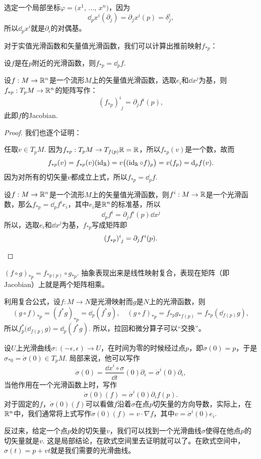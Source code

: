 选定一个局部坐标$\varphi=(x^1$, $\dots$, $x^n)$，因为
\[
	\dd_p x^i(\partial_j)=\partial_jx^i(p)=\delta^i_j,
\]
所以$\dd_p x^i$就是$\partial_i$的对偶基。

\begin{pro}对于实值光滑函数和矢量值光滑函数，我们可以计算出推前映射$f_{*p}$：
\begin{compactenum}
\item 设$f$是在$p$附近的光滑函数，则$f_{*p}=\dd_p f$. 
\item 设$f:M\to \mathbb{R}^n$是一个流形$M$上的矢量值光滑函数，选取$e_i$和$\dd x^j$为基，则$f_{*p}:T_pM\to \mathbb{R}^n$的矩阵写作：
\[
	(f_{*p})^{i}_{\phantom{i}j}=\partial_j f^i(p),
\]
此即$f$的Jacobian.
\end{compactenum}
\end{pro}

\begin{proof}
我们也逐个证明：
\begin{compactenum}
\item 任取$v\in T_pM$. 因为$f_{*p}:T_pM\to T_{f(p)}\mathbb{R}=\mathbb{R}$，所以$f_{*p}(v)$是一个数，故而
\[
	f_{*p}(v)=f_{*p}(v)(\operatorname{id}_{\mathbb{R}})=v\bigl((\operatorname{id}_{\mathbb{R}}\circ f)_p\bigr)=v(f_p)=\mathrm{d}_p f(v).
\]
因为对所有的切矢量$v$都成立上式，所以$f_{*p}=\dd_p f$.
\item 设$f:M\to \mathbb{R}^n$是一个流形$M$上的矢量值光滑函数，则$f^i:M\to \mathbb{R}$是一个光滑函数，那么$f_{*p}=\dd_pf^i e_i$，其中$e_i$是$\mathbb{R}^n$的标准基，所以
\[
\dd_pf^i=\partial_j f^i(p) \dd x^j
\]
所以，选取$e_i$和$\dd x^j$为基，$f_{*p}$写成矩阵即
\[
	(f_{*p})^{i}_{\phantom{i}j}=\partial_j f^i(p).\qedhere
\]
\end{compactenum}
\end{proof}

\begin{para}[复合函数求导法则]
$(f\circ g)_{*p}=f_{*g(p)}\circ g_{*p}$. 抽象表现出来是线性映射复合，表现在矩阵（即Jacobian）上就是两个矩阵相乘。
\end{para}

\begin{para}\label{f*d=df*}
利用复合公式，设$f:M\to N$是光滑映射而$g$是$N$上的光滑函数，则
\[
	(g\circ f)_{*p}=(f^*g)_{*p}=\dd_p(f^*g),\quad (g\circ f)_{*p}=f_{*p}g_{*f(p)}=f_{*p}\left(\dd_{f(p)}g \right),
\]
所以$f^*_p\bigl(\dd_{f(p)}g\bigr)=\dd_{p}(f^*g)$. 所以，拉回和微分算子可以“交换”。
\end{para}

\begin{para}
设$U$上光滑曲线$\sigma:(-\epsilon,\epsilon)\to U$，在时间为零的时候经过点$p$，即$\sigma(0)=p$，于是$\sigma_{*0}=\dot\sigma(0)\in T_pM$. 局部来说，他可以写作
\[
	\dot{\sigma}(0)=\frac{\dd x^i\circ \sigma}{\dd t}(0)\partial_i=\dot \sigma^i(0)\partial_i,
\]
当他作用在一个光滑函数上时，写作
\[
	\dot{\sigma}(0)(f)=\dot \sigma^i(0)\partial_if(p).
\]
对于固定的$f$，$\dot{\sigma}(0)(f)$可以看做$f$沿着$\sigma$在点$p$切矢量的方向导数，实际上，在$\mathbb{R}^n$中，我们通常将上式写作$\dot{\sigma}(0)(f)=v\cdot \nabla f$，其中$v=\dot \sigma^i(0)e_i$.

反过来，给定一个点$p$处的切矢量$v$，我们可以找到一个光滑曲线$\sigma$使得在他点$p$的切矢量就是$v$. 这是局部结论，在欧式空间里去证明就可以了。在欧式空间中，$\sigma(t)=p+vt$就是我们需要的光滑曲线。
\end{para}

